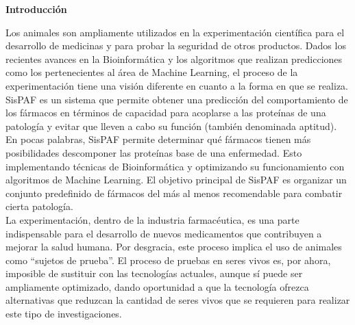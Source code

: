 \renewcommand{\headrulewidth}{0pt}
\begin{center}
    \Large
    \textbf{\newtitle}
    
    \large
    \vspace{0.4cm}
    \newauthor
    \vspace{0.9cm}
    
    \textbf{Introducción}\\
\end{center}
\noindent Los animales son ampliamente utilizados en la experimentación científica para el desarrollo de medicinas y para probar la seguridad de otros productos. Dados los recientes avances en la Bioinformática y los algoritmos que realizan predicciones como los pertenecientes al área de Machine Learning, el proceso de la experimentación tiene una visión diferente en cuanto a la forma en que se realiza.\\

\noindent SisPAF es un sistema que permite obtener una predicción del comportamiento de los fármacos en términos de capacidad para acoplarse a las proteínas de una patología y evitar que lleven a cabo su función (también denominada aptitud). En pocas palabras, SisPAF permite determinar qué fármacos tienen más posibilidades descomponer las proteínas base de  una enfermedad. Esto implementando técnicas de Bioinformática y optimizando su funcionamiento con algoritmos de Machine Learning.
El objetivo principal de SisPAF es organizar un conjunto predefinido de fármacos del más al menos recomendable para combatir cierta patología.\\

\noindent La experimentación, dentro de la industria farmacéutica, es una parte indispensable para el desarrollo de nuevos medicamentos que contribuyen a mejorar la salud humana. Por desgracia, este proceso implica el uso de animales como “sujetos de prueba”. El proceso de pruebas en seres vivos es, por ahora, imposible de sustituir con las tecnologías actuales, aunque sí puede ser ampliamente optimizado, dando oportunidad a que la tecnología ofrezca alternativas que reduzcan la cantidad de seres vivos que se requieren para realizar este tipo de investigaciones.